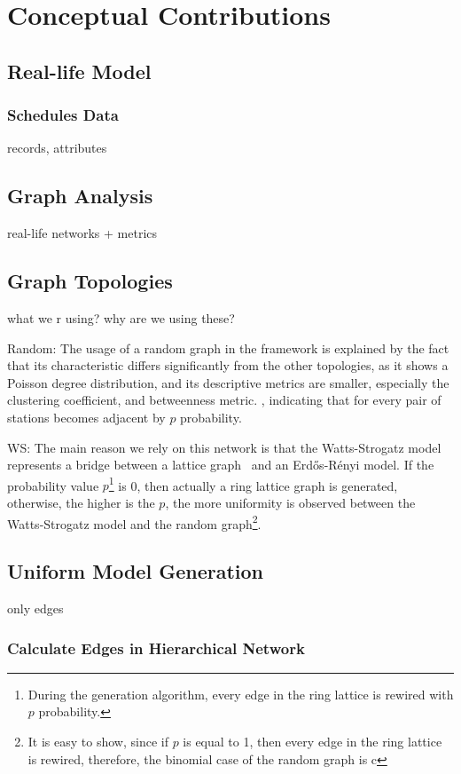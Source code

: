 \chapter{Conceptual Contributions}

\section{Real-life Model}
\subsection{Schedules Data}
records, attributes

\section{Graph Analysis}
real-life networks + metrics
\section{Graph Topologies}
what we r using?
why are we using these?

Random:
	The usage of a random graph in the framework is explained by the fact that its characteristic differs significantly from the other topologies, as it shows a Poisson degree distribution, and its descriptive metrics are smaller, especially the clustering coefficient, and betweenness metric. , indicating that for every pair of stations becomes adjacent by $p$ probability. 
	
WS:
	The main reason we rely on this network is that the Watts-Strogatz model represents a bridge between a lattice graph~\cite{lattice} and an Erdős-Rényi model. If the probability value $p$\footnote{During the generation algorithm, every edge in the ring lattice is rewired with $p$ probability.} is 0, then actually a ring lattice graph is generated, otherwise, the higher is the $p$, the more uniformity is observed between the Watts-Strogatz model and the random graph\footnote{It is easy to show, since if $p$ is equal to 1, then every edge in the ring lattice is rewired, therefore, the binomial case of the random graph is c}.
	

\section{Uniform Model Generation}
only edges
\subsection{Calculate Edges in Hierarchical Network}

